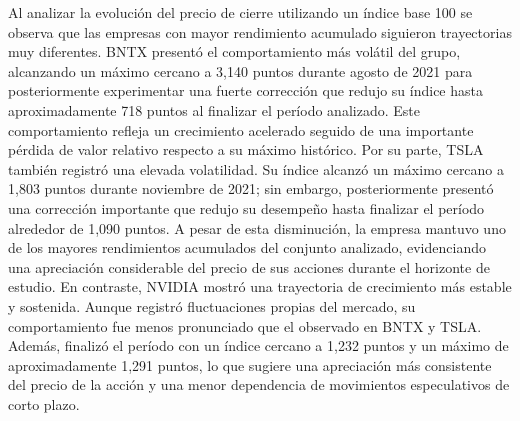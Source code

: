 Al analizar la evolución del precio de cierre utilizando un índice base 100 se observa que las empresas con mayor rendimiento acumulado siguieron trayectorias muy diferentes. BNTX presentó el comportamiento más volátil del grupo, alcanzando un máximo cercano a 3,140 puntos durante agosto de 2021 para posteriormente experimentar una fuerte corrección que redujo su índice hasta aproximadamente 718 puntos al finalizar el período analizado. Este comportamiento refleja un crecimiento acelerado seguido de una importante pérdida de valor relativo respecto a su máximo histórico.
Por su parte, TSLA también registró una elevada volatilidad. Su índice alcanzó un máximo cercano a 1,803 puntos durante noviembre de 2021; sin embargo, posteriormente presentó una corrección importante que redujo su desempeño hasta finalizar el período alrededor de 1,090 puntos. A pesar de esta disminución, la empresa mantuvo uno de los mayores rendimientos acumulados del conjunto analizado, evidenciando una apreciación considerable del precio de sus acciones durante el horizonte de estudio.
En contraste, NVIDIA mostró una trayectoria de crecimiento más estable y sostenida. Aunque registró fluctuaciones propias del mercado, su comportamiento fue menos pronunciado que el observado en BNTX y TSLA. Además, finalizó el período con un índice cercano a 1,232 puntos y un máximo de aproximadamente 1,291 puntos, lo que sugiere una apreciación más consistente del precio de la acción y una menor dependencia de movimientos especulativos de corto plazo.